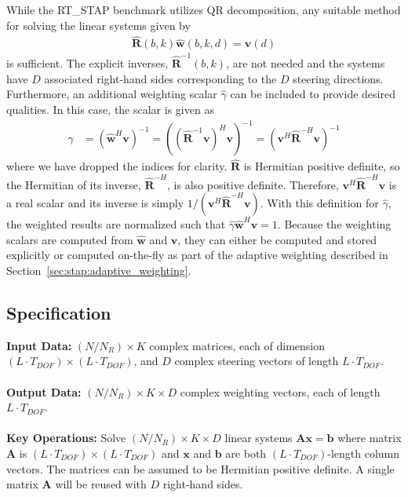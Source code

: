 \documentclass{report}
\begin{document}
While the RT\_STAP benchmark utilizes QR decomposition, any
suitable method for solving the linear systems given by
\begin{align}
    \hat{\mathbf{R}}(b,k) \hat{\mathbf{w}}(b,k,d) = \mathbf{v}(d)
\end{align}
is sufficient.
The explicit inverses, $\hat{\mathbf{R}}^{-1}(b,k)$, are not needed
and the systems have $D$ associated right-hand sides corresponding
to the $D$ steering directions.
Furthermore, an additional weighting scalar $\hat{\gamma}$ can be
included to provide desired qualities.
In this case, the scalar is given as
\begin{align}
    \hat{\gamma} & = (\hat{\mathbf{w}}^H \mathbf{v})^{-1}
        = ((\hat{\mathbf{R}}^{-1} \mathbf{v})^H \mathbf{v})^{-1}
        = (\mathbf{v}^H \hat{\mathbf{R}}^{-H} \mathbf{v})^{-1}
\end{align}
where we have dropped the indices for clarity.
$\hat{\mathbf{R}}$ is Hermitian positive definite, so the Hermitian of
its inverse, $\hat{\mathbf{R}}^{-H}$, is also positive definite.
Therefore, $\mathbf{v}^H \hat{\mathbf{R}}^{-H} \mathbf{v}$ is
a real scalar and its inverse is simply $1/(\mathbf{v}^H \hat{\mathbf{R}}^{-H} \mathbf{v})$.
With this definition for $\hat{\gamma}$, the weighted results are normalized
such that $\hat{\gamma} \hat{\mathbf{w}}^H \mathbf{v} = 1$.
Because the weighting scalars are computed from $\hat{\mathbf{w}}$ and
$\mathbf{v}$, they can either be computed and stored explicitly or
computed on-the-fly as part of the adaptive weighting described
in Section~\ref{sec:stap:adaptive_weighting}.

\subsection{Specification}
\label{sec:stap:weight_generation:spec}

\textbf{Input Data:} $(N/N_R) \times K$ complex matrices, each of dimension
$(L \cdot T_{DOF}) \times (L \cdot T_{DOF})$, and $D$ complex steering vectors
of length $L \cdot T_{DOF}$. \\ \\
\textbf{Output Data:} $(N/N_R) \times K \times D$ complex weighting vectors,
each of length $L \cdot T_{DOF}$. \\ \\
\textbf{Key Operations:}
Solve  $(N/N_R) \times K \times D$ linear systems $\mathbf{Ax = b}$ where
matrix $\mathbf{A}$ is $(L \cdot T_{DOF}) \times (L \cdot T_{DOF})$ and $\mathbf{x}$
and $\mathbf{b}$ are both $(L \cdot T_{DOF})$-length column vectors.
The matrices can be assumed to be Hermitian positive definite.
A single matrix $\mathbf{A}$ will be reused with $D$ right-hand sides.
\end{document}
